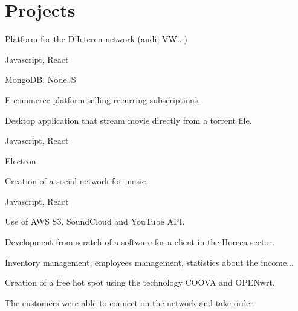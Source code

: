 \documentclass[]{my-resume}
\begin{document}
\begin{minipage}[t]{0.66\textwidth}

\section{Projects}

Platform for the D'Ieteren network (audi, VW...)
\begin{tightemize}
\item Javascript, React
\item MongoDB, NodeJS
\end{tightemize}
\sectionsep

E-commerce platform selling recurring subscriptions.

\sectionsep

Desktop application that stream movie directly from a torrent file.
\begin{tightemize}
\item Javascript, React
\item Electron
\end{tightemize}
\sectionsep


Creation of a social network for music.
\begin{tightemize}
\item Javascript, React
\item Use of AWS S3, SoundCloud and YouTube API.
\end{tightemize}
\sectionsep


Development from scratch of a software for a client in the Horeca sector. 
\begin{tightemize}
\item Inventory management, employees management, statistics about the income...
\item  Creation of a free hot spot using the technology COOVA and OPENwrt. 
\item The customers were able to connect on the network and take order.
\end{tightemize}
\sectionsep

\end{minipage} 
\end{document}
